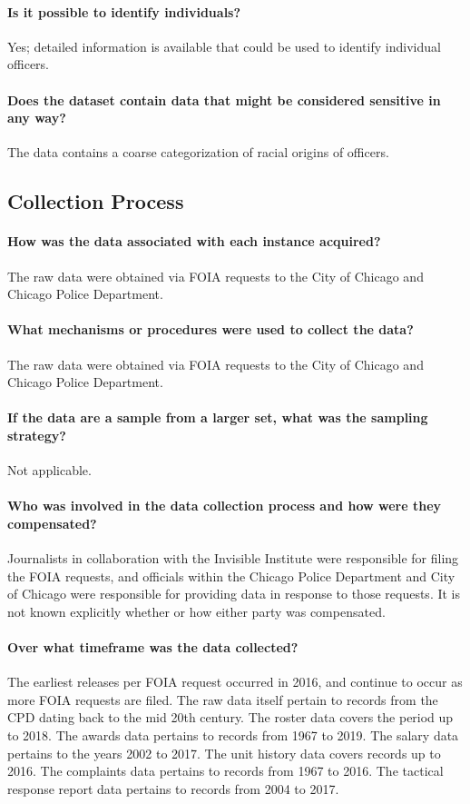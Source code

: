 \paragraph{Is it possible to identify individuals?}
Yes; detailed information is available that could be used to identify individual officers.

\paragraph{Does the dataset contain data that might be considered sensitive in any way?}
The data contains a coarse categorization of racial origins of officers.

\subsection{Collection Process}

\paragraph{How was the data associated with each instance acquired?}
The raw data were obtained via FOIA requests to the City of Chicago and Chicago Police Department.

\paragraph{What mechanisms or procedures were used to collect the data?}
The raw data were obtained via FOIA requests to the City of Chicago and Chicago Police Department.

\paragraph{If the data are a sample from a larger set, what was the sampling strategy?}
Not applicable. 

\paragraph{Who was involved in the data collection process and how were they compensated?}
Journalists in collaboration with the Invisible Institute were responsible for filing
the FOIA requests, and officials within the Chicago Police Department and City of Chicago were responsible
for providing data in response to those requests. It is not known explicitly whether or how 
either party was compensated.

\paragraph{Over what timeframe was the data collected?}
The earliest releases per FOIA request occurred in 2016, and continue to occur
as more FOIA requests are filed. The raw data itself pertain to records from the CPD
dating back to the mid 20th century. The roster data covers the period up
to 2018. The awards data pertains to records from 1967 to 2019.
The salary data pertains to the years 2002 to 2017. The unit history data covers records up
to 2016. The complaints data pertains to records from 1967 to 2016. The tactical response 
report data pertains to records from 2004 to 2017.

